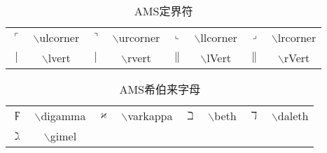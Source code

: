 \documentclass[UTF8]{ctexart}
\begin{document}
\begin{table}[H]
	\begin{center}
		\caption{AMS定界符}
		\begin{tabular}{cccccccc}
			
			
			$\ulcorner$  &  $\backslash$ulcorner  &  $\urcorner$  & $\backslash$urcorner  &  $\llcorner$  & $\backslash$llcorner  &  $\lrcorner$  &  $\backslash$lrcorner \\
			
			$\lvert$ & $\backslash$lvert &  $\rvert$  & $\backslash$rvert   &  $\lVert$  & $\backslash$lVert &  $\rVert$ & $\backslash$rVert \\
			
		\end{tabular}
	\end{center}
\end{table}



\begin{table}[H]
	\begin{center}
		\caption{AMS希伯来字母}
		\begin{tabular}{cccccccc}
			
			$\digamma$  &  $\backslash$digamma  &  $\varkappa$  & $\backslash$varkappa  &  $\beth$  & $\backslash$beth  &  $\daleth$  &  $\backslash$daleth \\
			
			$\gimel$ & $\backslash$gimel \\
			
		\end{tabular}
	\end{center}
\end{table}
\end{document}
